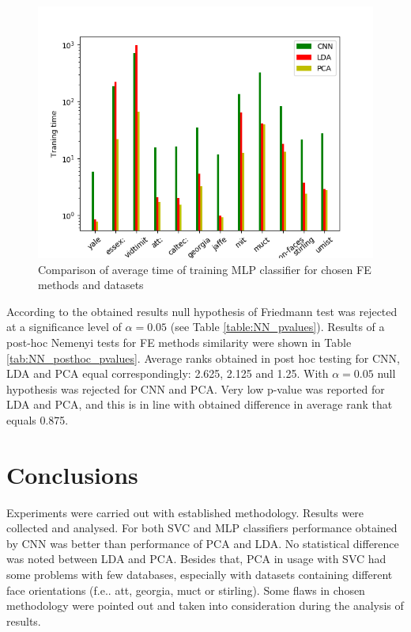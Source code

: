 \documentclass[a4paper, 10 pt, journal]{ieeeconf}
\begin{document}
\begin{figure}[!h]
    \centering
    \includegraphics[scale=0.875]{images/NN_fit_time_comparison.png}
    \caption{Comparison of average time of training MLP classifier for chosen FE methods and datasets}
    \label{fig:svm_fit_time_comparision}
\end{figure}

\newpage

According to the obtained results null hypothesis of Friedmann test was rejected at a significance level of $\alpha = 0.05$ (see Table \ref{table:NN_pvalues}). 
Results of a post-hoc Nemenyi tests for FE methods similarity were shown in Table \ref{tab:NN_posthoc_pvalues}. 
Average ranks obtained in post hoc testing for CNN, LDA and PCA equal correspondingly: 2.625, 2.125 and 1.25.
With $\alpha = 0.05$ null hypothesis was rejected for CNN and PCA.
Very low p-value was reported for LDA and PCA, and this is in line with obtained difference in average rank that equals 0.875.

\newpage


\section{Conclusions}

Experiments were carried out with established methodology. Results were collected and analysed. For both SVC and MLP classifiers performance obtained by CNN was better than performance of PCA and LDA. No statistical difference was noted between LDA and PCA. Besides that, PCA in usage with SVC had some problems with few databases, especially with datasets containing different face orientations (f.e.. att, georgia, muct or stirling). Some flaws in chosen methodology were pointed out and taken into consideration during the analysis of results.
\end{document}
